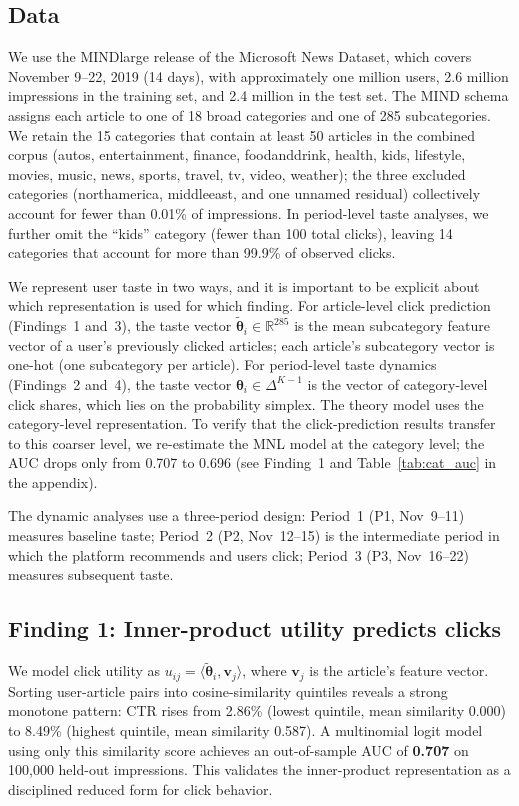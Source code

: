 \documentclass[11pt]{article}
\newcommand{\R}{\mathbb{R}}
\begin{document}
\subsection{Data}

We use the MINDlarge release of the Microsoft News Dataset, which covers November 9--22, 2019 (14 days), with approximately one million users, 2.6 million impressions in the training set, and 2.4 million in the test set. The MIND schema assigns each article to one of 18 broad categories and one of 285 subcategories. We retain the 15 categories that contain at least 50 articles in the combined corpus (autos, entertainment, finance, foodanddrink, health, kids, lifestyle, movies, music, news, sports, travel, tv, video, weather); the three excluded categories (northamerica, middleeast, and one unnamed residual) collectively account for fewer than 0.01\% of impressions. In period-level taste analyses, we further omit the ``kids'' category (fewer than 100 total clicks), leaving 14 categories that account for more than 99.9\% of observed clicks.

We represent user taste in two ways, and it is important to be explicit about which representation is used for which finding. For article-level click prediction (Findings~1 and~3), the taste vector $\tilde{\boldsymbol{\theta}}_i \in \R^{285}$ is the mean subcategory feature vector of a user's previously clicked articles; each article's subcategory vector is one-hot (one subcategory per article). For period-level taste dynamics (Findings~2 and~4), the taste vector $\boldsymbol{\theta}_i \in \Delta^{K-1}$ is the vector of category-level click shares, which lies on the probability simplex. The theory model uses the category-level representation. To verify that the click-prediction results transfer to this coarser level, we re-estimate the MNL model at the category level; the AUC drops only from 0.707 to 0.696 (see Finding~1 and Table~\ref{tab:cat_auc} in the appendix).

The dynamic analyses use a three-period design: Period~1 (P1, Nov~9--11) measures baseline taste; Period~2 (P2, Nov~12--15) is the intermediate period in which the platform recommends and users click; Period~3 (P3, Nov~16--22) measures subsequent taste.

\subsection{Finding 1: Inner-product utility predicts clicks}

We model click utility as $u_{ij} = \langle \tilde{\boldsymbol{\theta}}_i, \mathbf{v}_j \rangle$, where $\mathbf{v}_j$ is the article's feature vector. Sorting user-article pairs into cosine-similarity quintiles reveals a strong monotone pattern: CTR rises from 2.86\% (lowest quintile, mean similarity 0.000) to 8.49\% (highest quintile, mean similarity 0.587). A multinomial logit model using only this similarity score achieves an out-of-sample AUC of \textbf{0.707} on 100,000 held-out impressions. This validates the inner-product representation as a disciplined reduced form for click behavior.
\end{document}
